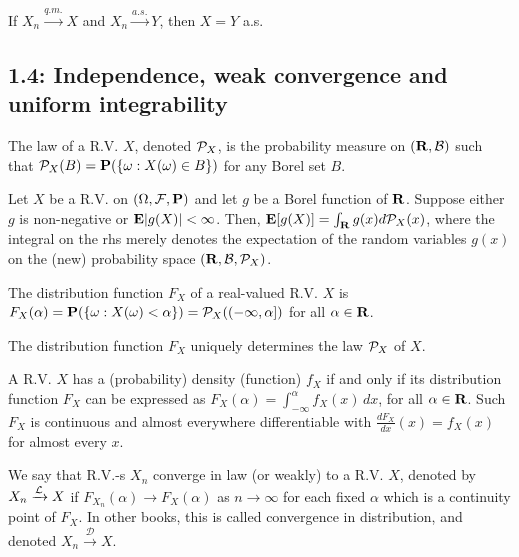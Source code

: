 \begin{proposition*} 
If $X_n \xrightarrow{q.m.} X$ and $X_n \xrightarrow{a.s.} Y$, then $X = Y$ a.s.
\end{proposition*} 

\subsection*{1.4: Independence, weak convergence and uniform integrability}

\begin{definition*} 
The law of a R.V. $X$, denoted $\mathcal{P}_X$, is the probability measure on $(\mathbf{R},
\mathcal{B})$ such that $\mathcal{P}_X(B) = \mathbf{P}(\{\omega: X(\omega) \in B\})$ for any Borel set
$B$.
\end{definition*} 

\begin{proposition*} 
Let $X$ be a R.V. on $(\Omega, \mathcal{F}, \mathbf{P})$ and let $g$ be a Borel function of
$\mathbf{R}$. Suppose either $g$ is non-negative or $\mathbf{E}|g(X)| < \infty$. Then,
$\mathbf{E}[g(X)] = \int_{\mathbf{R}} g(x) d\mathcal{P}_X(x)$, where the integral on the rhs merely
denotes the expectation of the random variables $g(x)$ on the (new) probability
space $(\mathbf{R}, \mathcal{B}, \mathcal{P}_X)$.
\end{proposition*} 

\begin{definition*} 
The distribution function $F_X$ of a real-valued R.V. $X$ is
$F_X(\alpha) = \mathbf{P}(\{\omega: X(\omega) < \alpha\}) = \mathcal{P}_X((-\infty, \alpha])$
for all $\alpha \in \mathbf{R}$.
\end{definition*} 

\begin{proposition*} 
The distribution function $F_X$ uniquely determines the law $\mathcal{P}_X$ of $X$.
\end{proposition*} 

\begin{proposition*} 
A R.V. $X$ has a (probability) density (function) $f_X$ if and only if its
distribution function $F_X$ can be expressed as $F_X(\alpha) =
\int_{-\infty}^\alpha f_X(x)\,dx$, for all $\alpha \in \mathbf{R}$. Such $F_X$ is
continuous and almost everywhere differentiable with $\frac{dF_X}{dx}(x) =
f_X(x)$ for almost every $x$.
\end{proposition*}

\begin{definition*} 
We say that R.V.-s $X_n$ converge in law (or weakly) to a R.V. $X$, denoted by
$X_n \xrightarrow{\mathcal{L}} X$ if $F_{X_n} (\alpha) \rightarrow F_X (\alpha)$ as $n
\rightarrow \infty$ for each fixed $\alpha$ which is a continuity point of
$F_X$. In other books, this is called convergence in distribution, and denoted
$X_n \xrightarrow{\mathcal{D}} X$.
\end{definition*} 

